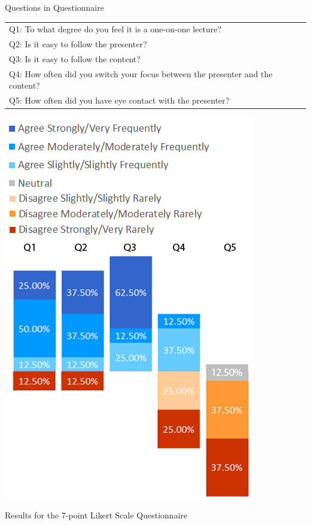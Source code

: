 \documentclass[sigchi-a]{acmart}
\begin{document}
\begin{margintable}
\vspace{-3cm}
    \caption{Questions in Questionnaire}
    \label{tab:table2}
    \begin{tabular}{p{5.5cm}}
    \toprule
      Q1: To what degree do you feel it is a one-on-one lecture?\\
      Q2: Is it easy to follow the presenter?\\
      Q3: Is it easy to follow the content?\\
      Q4: How often did you switch your focus between the presenter and the content?\\
      Q5: How often did you have eye contact with the presenter?\\
      \bottomrule
    \end{tabular}
\end{margintable}

\begin{marginfigure}
    \includegraphics[width=0.9\marginparwidth]{lr2}
    \caption{Results for the 7-point Likert Scale Questionnaire}
    \label{fig:results}
\end{marginfigure}



\end{document}
